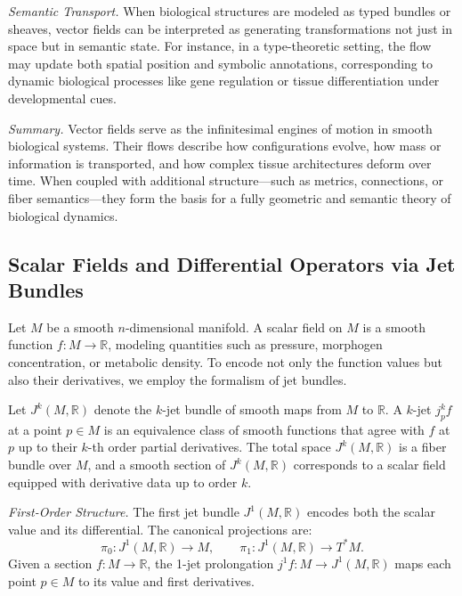 {\it Semantic Transport.} When biological structures are modeled as typed bundles or sheaves, vector fields can be interpreted as generating transformations not just in space but in semantic state. For instance, in a type-theoretic setting, the flow may update both spatial position and symbolic annotations, corresponding to dynamic biological processes like gene regulation or tissue differentiation under developmental cues.

{\it Summary.} Vector fields serve as the infinitesimal engines of motion in smooth biological systems. Their flows describe how configurations evolve, how mass or information is transported, and how complex tissue architectures deform over time. When coupled with additional structure—such as metrics, connections, or fiber semantics—they form the basis for a fully geometric and semantic theory of biological dynamics.



\subsection{Scalar Fields and Differential Operators via Jet Bundles}

Let $M$ be a smooth $n$-dimensional manifold. A scalar field on $M$ is a smooth function $f : M \to \mathbb{R}$, modeling quantities such as pressure, morphogen concentration, or metabolic density. To encode not only the function values but also their derivatives, we employ the formalism of jet bundles.

\begin{definition}
Let $J^k(M, \mathbb{R})$ denote the $k$-jet bundle of smooth maps from $M$ to $\mathbb{R}$. A $k$-jet $j^k_p f$ at a point $p \in M$ is an equivalence class of smooth functions that agree with $f$ at $p$ up to their $k$-th order partial derivatives. The total space $J^k(M, \mathbb{R})$ is a fiber bundle over $M$, and a smooth section of $J^k(M, \mathbb{R})$ corresponds to a scalar field equipped with derivative data up to order $k$.
\end{definition}

\textit{First-Order Structure.} The first jet bundle $J^1(M, \mathbb{R})$ encodes both the scalar value and its differential. The canonical projections are:
\[
\pi_0 : J^1(M, \mathbb{R}) \to M, \qquad \pi_1 : J^1(M, \mathbb{R}) \to T^*M.
\]
Given a section $f : M \to \mathbb{R}$, the 1-jet prolongation $j^1 f : M \to J^1(M, \mathbb{R})$ maps each point $p \in M$ to its value and first derivatives.

